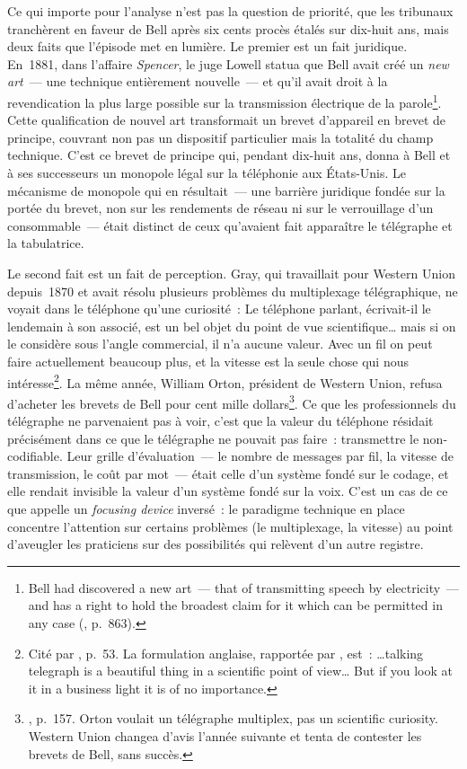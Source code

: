 %
Ce qui importe pour l'analyse n'est pas la question de priorité, que les tribunaux tranchèrent en faveur de Bell après six cents procès étalés sur dix-huit ans, mais deux faits que l'épisode met en lumière. Le premier est un fait juridique. En~1881, dans l'affaire \emph{Spencer}, le juge Lowell statua que Bell avait créé un \og \emph{new art}\fg{}~--- une technique entièrement nouvelle~--- et qu'il avait droit à la revendication la plus large possible sur la transmission électrique de la parole\footnote{\og Bell had discovered a new art~--- that of transmitting speech by electricity~--- and has a right to hold the broadest claim for it which can be permitted in any case\fg{} (\textcite{beauchamp_who_2010}, p.~863).}. Cette qualification de \og nouvel art\fg{} transformait un brevet d'appareil en brevet de principe, couvrant non pas un dispositif particulier mais la totalité du champ technique. C'est ce brevet de principe qui, pendant dix-huit ans, donna à Bell et à ses successeurs un monopole légal sur la téléphonie aux États-Unis. Le mécanisme de monopole qui en résultait~--- une barrière juridique fondée sur la portée du brevet, non sur les rendements de réseau ni sur le verrouillage d'un consommable~--- était distinct de ceux qu'avaient fait apparaître le télégraphe et la tabulatrice.

%
Le second fait est un fait de perception. Gray, qui travaillait pour Western Union depuis~1870 et avait résolu plusieurs problèmes du multiplexage télégraphique, ne voyait dans le téléphone qu'une curiosité~: \og Le téléphone parlant, écrivait-il le lendemain à son associé, est un bel objet du point de vue scientifique\ldots{} mais si on le considère sous l'angle commercial, il n'a aucune valeur. Avec un fil on peut faire actuellement beaucoup plus, et la vitesse est la seule chose qui nous intéresse\fg{}\footnote{Cité par \textcite{bertho_histoire_1984}, p.~53. La formulation anglaise, rapportée par \textcite{hounshell_elisha_1975}, est~: \og \ldots talking telegraph is a beautiful thing in a scientific point of view\ldots{} But if you look at it in a business light it is of no importance.\fg{}}. La même année, William Orton, président de Western Union, refusa d'acheter les brevets de Bell pour cent mille dollars\footnote{\textcite{hounshell_elisha_1975}, p.~157. Orton voulait un télégraphe multiplex, pas un \og scientific curiosity\fg{}. Western Union changea d'avis l'année suivante et tenta de contester les brevets de Bell, sans succès.}. Ce que les professionnels du télégraphe ne parvenaient pas à voir, c'est que la valeur du téléphone résidait précisément dans ce que le télégraphe ne pouvait pas faire~: transmettre le non-codifiable. Leur grille d'évaluation~--- le nombre de messages par fil, la vitesse de transmission, le coût par mot~--- était celle d'un système fondé sur le codage, et elle rendait invisible la valeur d'un système fondé sur la voix. C'est un cas de ce que \textcite{rosenberg_perspectives_1976} appelle un \emph{focusing device} inversé~: le paradigme technique en place concentre l'attention sur certains problèmes (le multiplexage, la vitesse) au point d'aveugler les praticiens sur des possibilités qui relèvent d'un autre registre.

